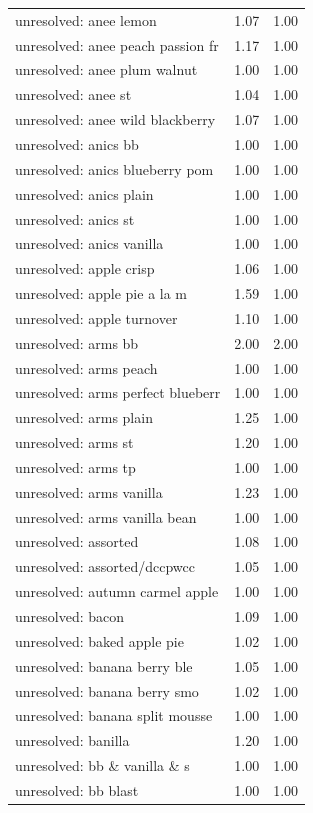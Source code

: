 \begin{table}
\begin{tabular}{lrr}
unresolved: anee lemon & 1.07 & 1.00 \\
unresolved: anee peach passion fr & 1.17 & 1.00 \\
unresolved: anee plum walnut & 1.00 & 1.00 \\
unresolved: anee st & 1.04 & 1.00 \\
unresolved: anee wild blackberry & 1.07 & 1.00 \\
unresolved: anics bb & 1.00 & 1.00 \\
unresolved: anics blueberry pom & 1.00 & 1.00 \\
unresolved: anics plain & 1.00 & 1.00 \\
unresolved: anics st & 1.00 & 1.00 \\
unresolved: anics vanilla & 1.00 & 1.00 \\
unresolved: apple crisp & 1.06 & 1.00 \\
unresolved: apple pie a la m & 1.59 & 1.00 \\
unresolved: apple turnover & 1.10 & 1.00 \\
unresolved: arms bb & 2.00 & 2.00 \\
unresolved: arms peach & 1.00 & 1.00 \\
unresolved: arms perfect blueberr & 1.00 & 1.00 \\
unresolved: arms plain & 1.25 & 1.00 \\
unresolved: arms st & 1.20 & 1.00 \\
unresolved: arms tp & 1.00 & 1.00 \\
unresolved: arms vanilla & 1.23 & 1.00 \\
unresolved: arms vanilla bean & 1.00 & 1.00 \\
unresolved: assorted & 1.08 & 1.00 \\
unresolved: assorted/dccpwcc & 1.05 & 1.00 \\
unresolved: autumn carmel apple & 1.00 & 1.00 \\
unresolved: bacon & 1.09 & 1.00 \\
unresolved: baked apple pie & 1.02 & 1.00 \\
unresolved: banana berry ble & 1.05 & 1.00 \\
unresolved: banana berry smo & 1.02 & 1.00 \\
unresolved: banana split mousse & 1.00 & 1.00 \\
unresolved: banilla & 1.20 & 1.00 \\
unresolved: bb \& vanilla \& s & 1.00 & 1.00 \\
unresolved: bb blast & 1.00 & 1.00 \\

\end{tabular}
\end{table}
